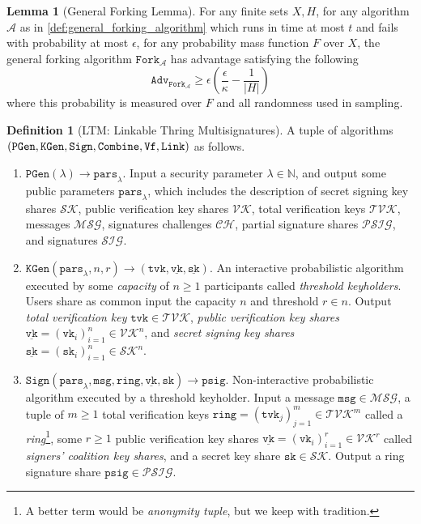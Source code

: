 \documentclass[11pt]{article}
\theoremstyle{definition}
\newtheorem{lemma}[lemma]{Lemma}
\newtheorem{definition}[definition]{Definition}
\newcommand{\sk}{\texttt{sk}}
\newcommand{\vk}{\texttt{vk}}
\newcommand{\tvk}{\texttt{tvk}}
\newcommand{\ring}{\texttt{ring}}
\newcommand{\SK}{\underline{\texttt{sk}}}
\newcommand{\VK}{\underline{\texttt{vk}}}
\newcommand{\psig}{\texttt{psig}}
\newcommand{\bbn}{\mathbb{N}}
\newcommand{\secpar}{\lambda}
\newcommand{\params}{\texttt{pars}}
\newcommand{\msg}{\texttt{msg}}
\newcommand{\setup}{\texttt{PGen}}
\newcommand{\setupI}{(\secpar)}
\newcommand{\setupO}{\params_\secpar}
\newcommand{\setupIO}{\setup\setupI\to\setupO}
\newcommand{\keygen}{\texttt{KGen}}
\newcommand{\keygenI}{(\setupO,n,r)}
\newcommand{\keygenO}{(\tvk,\VK,\SK)}
\newcommand{\keygenIO}{\keygen\keygenI\to\keygenO}
\newcommand{\sign}{\texttt{Sign}}
\newcommand{\signIbase}{(\setupO,\msg,\ring,\VK,\sk)}
\newcommand{\signO}{\psig}
\newcommand{\signIObase}{\sign\signIbase\to\signO}
\newcommand{\combine}{\texttt{Combine}}
\newcommand{\verify}{\texttt{Vf}}
\newcommand{\link}{\texttt{Link}}
\newcommand{\fork}{\texttt{Fork}}
\begin{document}
\begin{lemma}[General Forking Lemma]\label{lem:general_forking_lemma}
For any finite sets $X, H$, for any algorithm $\mathcal{A}$ as in  \cref{def:general_forking_algorithm} which runs in time at most $t$ and fails with probability at most $\epsilon$, for any probability mass function $F$ over $X$, the general forking algorithm $\fork_\mathcal{A}$ has advantage satisfying the following
\[\texttt{Adv}_{\fork_\mathcal{A}} \geq \epsilon \left(\frac{\epsilon}{\kappa} - \frac{1}{\left|H\right|}\right)\] where this probability is measured over $F$ and all randomness used in sampling.
\end{lemma}


\begin{definition}[LTM: Linkable Thring Multisignatures]\label{def:ltm}
A tuple of algorithms $(\setup, \keygen, \sign, \\ \combine, \verify, \link)$ as follows.
\begin{enumerate}
\item $\setupIO$. Input a security parameter $\secpar \in \bbn$, and output some public parameters $\params_\secpar$, which includes the description of secret signing key shares $\mathcal{SK}$, public verification key shares $\mathcal{VK}$, total verification keys $\mathcal{TVK}$, messages $\mathcal{MSG}$, signatures challenges $\mathcal{CH}$, partial signature shares $\mathcal{PSIG}$, and signatures $\mathcal{SIG}$.

\item $\keygenIO$. An interactive probabilistic algorithm executed by some \textit{capacity} of $n \geq 1$ participants called \textit{threshold keyholders}. Users share as common input the capacity $n$ and threshold $r \in n$. Output  \textit{total verification key} $\tvk \in \mathcal{TVK}$, \textit{public verification key shares} $\VK=(\vk_i)_{i=1}^{n} \in \mathcal{VK}^n$, and \textit{secret signing key shares} $\SK = (\sk_i)_{i=1}^{n} \in \mathcal{SK}^n$.



\item $\signIObase$. Non-interactive probabilistic algorithm executed by a threshold keyholder. Input a message $\msg \in \mathcal{MSG}$, a tuple of $m \geq 1$ total verification keys $\ring = (\tvk_j)_{j=1}^{m} \in \mathcal{TVK}^m$ called a \textit{ring}\footnote{A better term would be \textit{anonymity tuple}, but we keep with tradition.}, some $r \geq 1$ public verification key shares $\VK = (\vk_i)_{i=1}^{r} \in \mathcal{VK}^r$ called \textit{signers' coalition key shares},  and a secret key share $\sk \in \mathcal{SK}$. Output a ring signature share $\psig \in \mathcal{PSIG}$.


\end{enumerate}
\end{definition}
\end{document}
